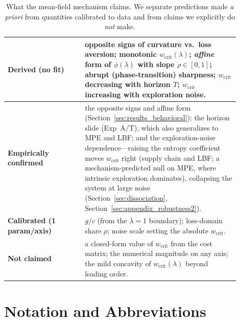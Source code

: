\documentclass[letterpaper]{article}
\theoremstyle{plain}
\newcommand{\wcrit}{w_{\mathrm{crit}}}
\begin{document}
\begin{table}[tb]
\centering
\caption{What the mean-field mechanism claims. We separate predictions made
\emph{a priori} from quantities calibrated to data and from claims we
explicitly do \emph{not} make.}
\label{tab:ledger}
\small
\begin{tabular}{p{0.30\linewidth}p{0.60\linewidth}}
\toprule
\textbf{Derived (no fit)} & opposite signs of curvature vs.\ loss aversion;
monotonic $\wcrit(\lambda)$; \emph{affine} form of $\phi(\lambda)$ with
slope $\rho\in[0,1]$; abrupt (phase-transition) sharpness; $\wcrit$
decreasing with horizon $T$; $\wcrit$ increasing with exploration noise. \\
\midrule
\textbf{Empirically confirmed} & the opposite signs and affine form
(Section~\ref{sec:results_behavioral}); the horizon slide (Exp~A/T), which also
generalizes to MPE and LBF; and the exploration-noise dependence---raising the
entropy coefficient moves $\wcrit$ right (supply chain and LBF; a
mechanism-predicted null on MPE, where intrinsic exploration dominates),
collapsing the system at large noise (Section~\ref{sec:dissociation},
Section~\ref{sec:appendix_robustness2}). \\
\midrule
\textbf{Calibrated (1 param/axis)} & $g/c$ (from the $\lambda{=}1$
boundary); loss-domain share $\rho$; noise scale setting the absolute
$\wcrit$. \\
\midrule
\textbf{Not claimed} & a closed-form value of $\wcrit$ from the cost matrix;
the numerical magnitude on any axis; the mild concavity of $\wcrit(\lambda)$
beyond leading order. \\
\bottomrule
\end{tabular}
\end{table}


\section{Notation and Abbreviations}
\label{sec:appendix_notation}
\end{document}
